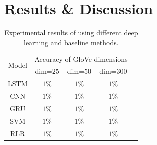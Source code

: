 \documentclass[8pt,conference,compsocconf]{IEEEtran}
\begin{document}
\section{Results \& Discussion} \label{sec:results}
\begin{table}[t]
	\centering
	\caption{Experimental results of using different deep learning and baseline methods.}
	\begin{tabular}{|c|c|c|c|c|}
		\hline
		\multirow{2}{*}{Model} &\multicolumn{3}{|c|}{Accuracy of GloVe dimensions} \\
		\cline{2-4}
	 										& dim=$25$ &dim=$50$&dim=$300$\\
		\hline
		LSTM & $1$\%&$1$\%&$1$\%\\
		\hline
		CNN &  $1$\% &$1$\%&$1$\%\\
		\hline
		GRU &  $1$\% &$1$\%&$1$\%\\
		\hline
		SVM&  $1$\% &$1$\%&$1$\%\\ 
		\hline
		RLR&  $1$\% &$1$\%&$1$\%\\ 
		\hline
	\end{tabular}
	\label{tab:6model_accuracy}
\end{table}
%
%
%
\end{document}
